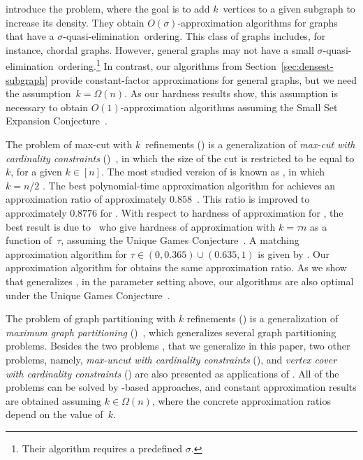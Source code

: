 \citet{matakos2022strengthening} introduce the \kdense problem, where the goal is to add
$k$~vertices to a given subgraph to increase its density. 
They obtain $O(\sigma)$-approximation algorithms for graphs that have a $\sigma$-quasi-elimination~ordering. 
This class of graphs includes, for instance, chordal graphs. However, general graphs may not have a small $\sigma$-quasi-elimination~ordering.\footnote{Their algorithm requires a predefined $\sigma$.}
In contrast, our algorithms from Section~\ref{sec:densest-subgraph} provide constant-factor approximations for general graphs, but we need the assumption~$k=\Omega(n)$. 
As our hardness results show, this assumption is necessary to obtain $O(1)$-approximation algorithms assuming the 
Small Set Expansion Conjecture~\citep{dblp:conf/stoc/raghavendras10}.

The problem of max-cut with $k$~refinements (\maxcutkc) is a generalization of \emph{max-cut with cardinality constraints} ({\ccmaxcut})~\citep{DBLP:journals/algorithmica/FriezeJ97,DBLP:journals/jcss/PapadimitriouY91}, in which the size of the cut is restricted to be equal to $k$, for a given $k \in [n]$.
The most studied version of {\ccmaxcut} is known as \maxbis, in which $k=n/2$
\citep{%
DBLP:journals/talg/AustrinBG16,%
DBLP:journals/jal/feigel01,%
DBLP:journals/algorithmica/FriezeJ97,%
DBLP:conf/soda/Manurangsi19,%
DBLP:conf/soda/RaghavendraT12%
}. 
The best polynomial-time approximation algorithm for {\ccmaxcut} achieves an approximation ratio of approximately $0.858$~\citep{DBLP:conf/soda/RaghavendraT12}.
This ratio is improved to approximately $0.8776$ for \maxbis 
\citep{DBLP:journals/talg/AustrinBG16}.
With respect to hardness of approximation for {\ccmaxcut}, the best result is due to~\citet{DBLP:conf/approx/AustrinS19} who give hardness of approximation with $k=\tau n$  as a function of~$\tau$, assuming the Unique Games Conjecture~\citep{DBLP:conf/stoc/Khot02a}.
A matching approximation algorithm for $\tau \in (0,0.365) \cup (0.635,1)$ is given by \citet{DBLP:conf/soda/RaghavendraT12}.
Our approximation algorithm for \maxcutkc obtains the same approximation ratio. As we show that \maxcutkc generalizes \ccmaxcut, in the parameter setting above, our algorithms are also optimal under the Unique Games Conjecture~\citep{DBLP:conf/stoc/Khot02a}.

The problem of graph partitioning with $k$ refinements (\gpkc) is a
generalization of \emph{maximum graph partitioning}
(\maxgp)~\citep{DBLP:journals/jal/feigel01, han2002improved,
	dblp:journals/rsa/halperinz02}, which generalizes several graph partitioning
	problems.
Besides the two problems \dks, \ccmaxcut that we generalize in this paper, two
other problems, namely, \emph{max-uncut with cardinality constraints} (\ccmaxuncut),
	  and \emph{vertex cover with cardinality constraints} (\ccvc) are also presented
	  as applications of \maxgp. 
All of the problems can be solved by \sdp-based approaches, and constant
approximation results are obtained assuming $k \in \Omega(n)$, where the
concrete approximation ratios depend on the value of~$k$. 

